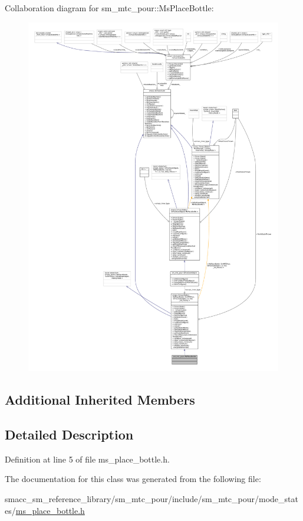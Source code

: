 Collaboration diagram for sm\+\_\+mtc\+\_\+pour\+:\+:Ms\+Place\+Bottle\+:
\nopagebreak
\begin{figure}[H]
\begin{center}
\leavevmode
\includegraphics[width=350pt]{classsm__mtc__pour_1_1MsPlaceBottle__coll__graph}
\end{center}
\end{figure}
\subsection*{Additional Inherited Members}


\subsection{Detailed Description}


Definition at line 5 of file ms\+\_\+place\+\_\+bottle.\+h.



The documentation for this class was generated from the following file\+:\begin{DoxyCompactItemize}
\item 
smacc\+\_\+sm\+\_\+reference\+\_\+library/sm\+\_\+mtc\+\_\+pour/include/sm\+\_\+mtc\+\_\+pour/mode\+\_\+states/\hyperlink{ms__place__bottle_8h}{ms\+\_\+place\+\_\+bottle.\+h}\end{DoxyCompactItemize}
